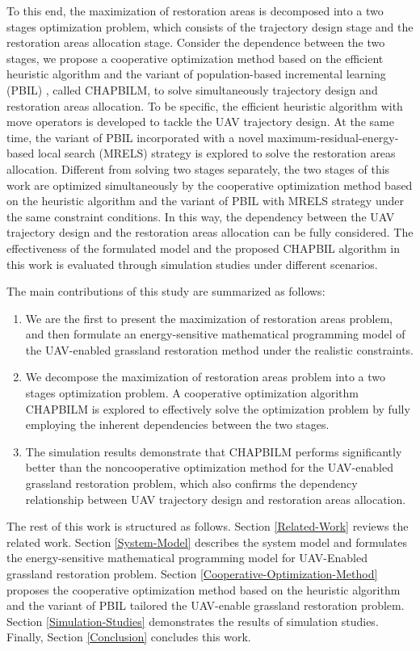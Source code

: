 \documentclass[preprint,5pt]{elsarticle}
\begin{document}
To this end, the maximization of restoration areas is decomposed into a two stages optimization problem, which consists of the trajectory design stage and the restoration areas allocation stage. Consider the dependence between the two stages, we propose a cooperative optimization method based on the efficient heuristic algorithm and the
variant of population-based incremental learning (PBIL) \cite{baluja1994population}, called CHAPBILM, to solve simultaneously trajectory design and restoration areas allocation. To be specific, the efficient heuristic algorithm with move operators is developed to tackle the UAV trajectory design. At the same time, the variant of PBIL incorporated with a novel maximum-residual-energy-based local search (MRELS) strategy is explored to solve the restoration areas allocation. Different from solving two stages separately, the two stages of this work are optimized simultaneously by the cooperative optimization method based on the heuristic algorithm and the variant of PBIL with MRELS strategy under the same constraint conditions. In this way, the dependency between the UAV trajectory design and the restoration areas allocation can be fully considered. The effectiveness of the formulated model and the proposed CHAPBIL algorithm in this work is evaluated through simulation studies under different scenarios.

The main contributions of this study are summarized as follows:
\begin{enumerate}
  \item We are the first to present the maximization of restoration areas problem, and then formulate an energy-sensitive mathematical programming model of the UAV-enabled grassland restoration method under the realistic constraints.
  \item We decompose the maximization of restoration areas problem into a two stages optimization problem.
        A cooperative optimization algorithm CHAPBILM is explored to effectively solve the optimization problem by fully employing the inherent dependencies between the two stages.
  \item The simulation results demonstrate that CHAPBILM performs significantly better than the noncooperative optimization method for the UAV-enabled grassland restoration problem, which also confirms the dependency relationship between UAV trajectory design and restoration areas allocation.
\end{enumerate}

The rest of this work is structured as follows. Section \ref{Related-Work} reviews the related work. Section \ref{System-Model} describes the system model and formulates the energy-sensitive mathematical programming model for UAV-Enabled grassland restoration problem. Section \ref{Cooperative-Optimization-Method} proposes the cooperative optimization method based on the heuristic algorithm and the variant of PBIL tailored  the UAV-enable grassland restoration problem. Section \ref{Simulation-Studies} demonstrates the results of simulation studies. Finally, Section \ref{Conclusion} concludes this work.
\end{document}
